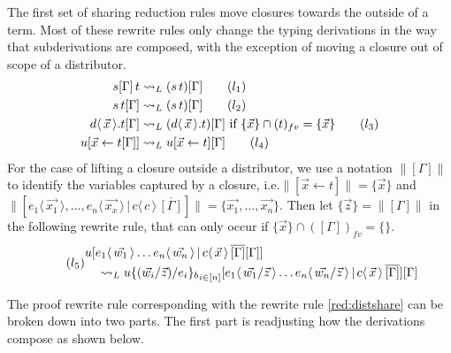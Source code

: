 \documentclass[a4paper,UKenglish,cleveref, autoref]{lipics-v2019}
\newcommand{\fv}[1]{(#1)_{fv}}
\newcommand{\set}[1]{ \{ #1 \} }
\newcommand{\app}[2]{#1 \, #2}
\newcommand{\fake}[3]{#1 \langle \, #2 \, \rangle . #3}
\newcommand{\share}[3]{#1 [#2 \leftarrow #3]}
\newcommand{\dist}[5]{#1 [ #2 \, \vert \, \fakedist{#4}{#5} \, #3 ]}
\newcommand{\fakedist}[2]{#1 \langle \, #2 \, \rangle}
\newcommand{\psub}[3]{#1 \{ #2 / #3 \}_{b}}
\newcommand{\bindvars}[1]{\parallel#1\parallel}
\begin{document}
The first set of sharing reduction rules move closures towards the outside of a term. Most of these rewrite rules only change the typing derivations in the way that subderivations are composed, with the exception of moving a closure out of scope of a distributor.
\begin{align}
\app{s[\Gamma]}{t} &\rightsquigarrow_{L} (\app{s}{t})[\Gamma]   \label{red:liftappleft} \tag{$l_{1}$} \\
\app{s}{t[\Gamma]} &\rightsquigarrow_{L} (\app{s}{t})[\Gamma] \label{red:liftappright} \tag{$l_{2}$} \\
\fake{d}{\vec{x}}{t[\Gamma]} &\rightsquigarrow_{L} (\fake{d}{\vec{x}}{t})[\Gamma]  \text{ if } \set{\vec{x}} \cap \fv{t} = \set{\vec{x}}  \label{red:liftabs} \tag{$l_{3}$} \\
\share{u}{\vec{x}}{t[\Gamma]} &\rightsquigarrow_{L} \share{u}{\vec{x}}{t}[\Gamma] \label{red:liftshare} \tag{$l_{4}$}
\end{align}
For the case of lifting a closure outside a distributor, we use a notation $\bindvars{[\Gamma]}$ to identify the variables captured by a closure, i.e.$\bindvars{\share{}{\vec{x}}{t}} = \set{\vec{x}}$ and $\bindvars{\dist{}{\fakedist{e_{1}}{\vec{x_{1}}}, \dots, \fakedist{e_{n}}{\vec{x_{x}}}}{\overline{[\Gamma]}}{c}{c}} = \set{\vec{x_{1}}, \dots, \vec{x_{n}}}$. Then let $\set{\vec{z}} = \bindvars{[\Gamma]}$ in the following rewrite rule, that can only occur if $\set{\vec{x}} \cap \fv{[\Gamma]} = \set{}$.
\begin{equation} \label{red:distshare} \tag{$l_{5}$}
\begin{multlined}
\dist{u}{\fakedist{e_{1}}{\vec{w_{1}}} \dots \fakedist{e_{n}}{\vec{w_{n}}}}{\overline{[\Gamma]} [\Gamma]}{c}{\vec{x}} \\ \rightsquigarrow_{L} \dist{u {\psub{}{(\vec{w_{i}} / \vec{z})}{e_{i}}}_{i \in [n]}}{\fakedist{e_{1}}{\vec{w_{1}} / \vec{z}} \dots \fakedist{e_{n}}{\vec{w_{n}} / \vec{z}}}{\overline{[\Gamma]}}{c}{\vec{x}}[\Gamma]
\end{multlined}
\end{equation}

The proof rewrite rule corresponding with the rewrite rule \ref{red:distshare} can be broken down into two parts. The first part is readjusting how the derivations compose as shown below.
\end{document}
